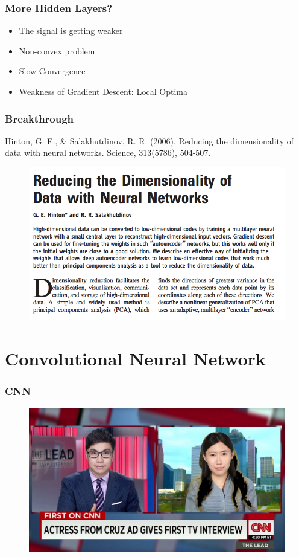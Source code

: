\documentclass{beamer}
\begin{document}
\begin{frame}
	\frametitle{More Hidden Layers?}
	\begin{itemize}
		\item The signal is getting weaker
		\item Non-convex problem
		\item Slow Convergence
		\item Weakness of Gradient Descent: Local Optima
	\end{itemize}
\end{frame}

\begin{frame}
	\frametitle{Breakthrough}
	{\small Hinton, G. E., \& Salakhutdinov, R. R. (2006). Reducing the dimensionality of data with neural networks. Science, 313(5786), 504-507.}
	\begin{figure}
		\includegraphics[width=0.95\linewidth]{breakthrough}
	\end{figure}
\end{frame}

\section{Convolutional Neural Network}
\begin{frame}
	\frametitle{CNN}
	\begin{figure}
		\includegraphics[width=\linewidth]{cnn_tv_dapeng}
	\end{figure}
\end{frame}
\end{document}
